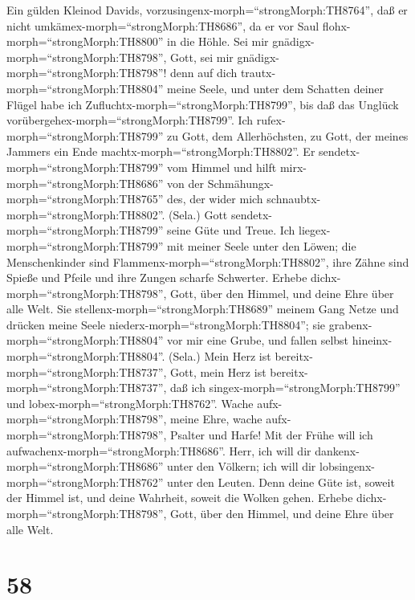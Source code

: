  Ein gülden Kleinod Davids,
vorzusingenx-morph=``strongMorph:TH8764'', daß er nicht
umkämex-morph=``strongMorph:TH8686'', da er vor Saul
flohx-morph=``strongMorph:TH8800'' in die Höhle. Sei mir
gnädigx-morph=``strongMorph:TH8798'', Gott, sei mir
gnädigx-morph=``strongMorph:TH8798''! denn auf dich
trautx-morph=``strongMorph:TH8804'' meine Seele, und unter dem Schatten
deiner Flügel habe ich Zufluchtx-morph=``strongMorph:TH8799'', bis daß
das Unglück vorübergehex-morph=``strongMorph:TH8799''.  Ich
rufex-morph=``strongMorph:TH8799'' zu Gott, dem Allerhöchsten, zu Gott,
der meines Jammers ein Ende machtx-morph=``strongMorph:TH8802''.
 Er sendetx-morph=``strongMorph:TH8799'' vom Himmel und
hilft mirx-morph=``strongMorph:TH8686'' von der
Schmähungx-morph=``strongMorph:TH8765'' des, der wider mich
schnaubtx-morph=``strongMorph:TH8802''. (Sela.) Gott
sendetx-morph=``strongMorph:TH8799'' seine Güte und Treue. 
Ich liegex-morph=``strongMorph:TH8799'' mit meiner Seele unter den
Löwen; die Menschenkinder sind Flammenx-morph=``strongMorph:TH8802'',
ihre Zähne sind Spieße und Pfeile und ihre Zungen scharfe Schwerter.
 Erhebe dichx-morph=``strongMorph:TH8798'', Gott, über den
Himmel, und deine Ehre über alle Welt.  Sie
stellenx-morph=``strongMorph:TH8689'' meinem Gang Netze und drücken
meine Seele niederx-morph=``strongMorph:TH8804''; sie
grabenx-morph=``strongMorph:TH8804'' vor mir eine Grube, und fallen
selbst hineinx-morph=``strongMorph:TH8804''. (Sela.)  Mein
Herz ist bereitx-morph=``strongMorph:TH8737'', Gott, mein Herz ist
bereitx-morph=``strongMorph:TH8737'', daß ich
singex-morph=``strongMorph:TH8799'' und
lobex-morph=``strongMorph:TH8762''.  Wache
aufx-morph=``strongMorph:TH8798'', meine Ehre, wache
aufx-morph=``strongMorph:TH8798'', Psalter und Harfe! Mit der Frühe will
ich aufwachenx-morph=``strongMorph:TH8686''.  Herr, ich will
dir dankenx-morph=``strongMorph:TH8686'' unter den Völkern; ich will dir
lobsingenx-morph=``strongMorph:TH8762'' unter den Leuten. 
Denn deine Güte ist, soweit der Himmel ist, und deine Wahrheit, soweit
die Wolken gehen.  Erhebe
dichx-morph=``strongMorph:TH8798'', Gott, über den Himmel, und deine
Ehre über alle Welt.

\hypertarget{section-57}{%
\section{58}\label{section-57}}

